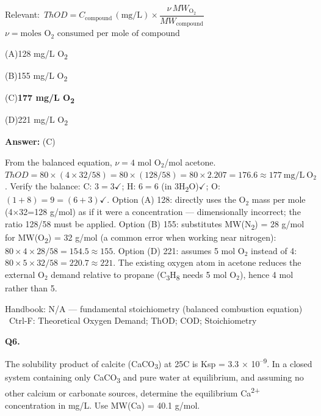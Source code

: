 \documentclass[11pt]{article}
\newcommand{\correct}[1]{\textbf{#1}\;{\color{accent}$\checkmark$}}
\newcommand{\optline}[2]{\par\noindent\hspace{1.2em}(#1)\hspace{0.6em}#2}
\begin{document}
{\small\color{soft}Relevant:}\ $ThOD = C_{\mathrm{compound}}\,(\mathrm{mg/L})\times\dfrac{\nu\,MW_{\mathrm{O_2}}}{MW_{\mathrm{compound}}}$ \quad $\nu = \text{moles O}_2\text{ consumed per mole of compound}$\par\vspace{3pt}
\optline{A}{128 mg/L O\textsubscript{2}}
\optline{B}{155 mg/L O\textsubscript{2}}
\optline{C}{\correct{177 mg/L O\textsubscript{2}}}
\optline{D}{221 mg/L O\textsubscript{2}}
\par\vspace{3pt}
\vspace{2pt}\par\noindent\colorbox{boxbg}{\parbox{\dimexpr\linewidth-2\fboxsep\relax}{%
\vspace{2pt}\textbf{Answer:} (C)\par\vspace{2pt}
{\small From the balanced equation, $\nu = 4$ mol O$_2$/mol acetone. $ThOD = 80\times(4\times32/58) = 80\times(128/58) = 80\times2.207 = 176.6\approx177\ \mathrm{mg/L\ O_2}$. Verify the balance: C: $3=3$$\checkmark$; H: $6=6$ (in 3H\textsubscript{2}O)$\checkmark$; O: $(1+8)=9 = (6+3)$$\checkmark$. Option (A) 128: directly uses the O$_2$ mass per mole (4$\times$32=128 g/mol) as if it were a concentration --- dimensionally incorrect; the ratio 128/58 must be applied. Option (B) 155: substitutes MW(N\textsubscript{2}) = 28 g/mol for MW(O\textsubscript{2}) = 32 g/mol (a common error when working near nitrogen): $80\times4\times28/58 = 154.5\approx155$. Option (D) 221: assumes 5 mol O$_2$ instead of 4: $80\times5\times32/58 = 220.7\approx221$. The existing oxygen atom in acetone reduces the external O$_2$ demand relative to propane (C\textsubscript{3}H\textsubscript{8} needs 5 mol O$_2$), hence 4 mol rather than 5.}\par\vspace{2pt}
{\footnotesize\color{soft}Handbook: N/A --- fundamental stoichiometry (balanced combustion equation) \textbullet\ Ctrl-F: Theoretical Oxygen Demand; ThOD; COD; Stoichiometry}\vspace{2pt}
}}
\vspace{9pt}
\filbreak
\textbf{\color{accent}Q6.}\par\vspace{2pt}
The solubility product of calcite (CaCO\textsubscript{3}) at 25\textdegree{}C is Ksp = 3.3 $\times$ 10\textsuperscript{--}\textsuperscript{9}. In a closed system containing only CaCO\textsubscript{3} and pure water at equilibrium, and assuming no other calcium or carbonate sources, determine the equilibrium Ca\textsuperscript{2}\textsuperscript{+} concentration in mg/L. Use MW(Ca) = 40.1 g/mol.\par\vspace{3pt}
\end{document}
